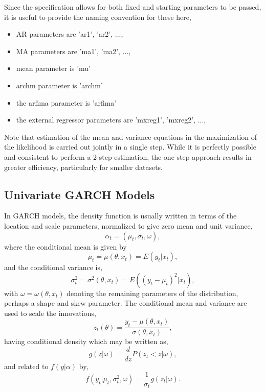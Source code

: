 Since the specification allows for both fixed and starting parameters to be
passed, it is useful to provide the naming convention for these here,
\begin{itemize}
\item AR parameters are 'ar1', 'ar2', ...,
\item MA parameters are 'ma1', 'ma2', ...,
\item mean parameter is 'mu'
\item archm parameter is 'archm'
\item the arfima parameter is 'arfima'
\item the external regressor parameters are 'mxreg1', 'mxreg2', ...,
\end{itemize}
Note that estimation of the mean and variance equations in the maximization of
the likelihood is carried out jointly in a single step. While it is perfectly
possible and consistent to perform a 2-step estimation, the one step approach
results in greater efficiency, particularly for smaller datasets.
\subsection{Univariate GARCH Models}\label{section:ugarch}
In GARCH models, the density function is usually written in terms of the
location and scale parameters, normalized to give zero mean and  unit variance,
\begin{equation}\label{garchdensity1}
{\alpha _t} = ({\mu_t},{\sigma_t},{\omega}),
\end{equation}
where the conditional mean is given by
\begin{equation}\label{garchdensity2}
{\mu _t} = \mu (\theta ,{x_t}) = E({y_t}|{x_t}),
\end{equation}
and the conditional variance is,
\begin{equation}\label{garchdensity3}
\sigma _t^2 = {\sigma ^2}(\theta ,{x_t}) = E({({y_t} - {\mu _t})^2}|{x_t}),
\end{equation}
with ${\omega} = \omega (\theta ,{x_t})$ denoting the remaining parameters of
the distribution, perhaps a shape and skew parameter. The conditional mean and
variance are used to scale the innovations,
\begin{equation}\label{garchdensity4}
{z_t}(\theta ) = \frac{{{y_t} - \mu (\theta ,{x_t})}}{{\sigma (\theta ,{x_t})}},
\end{equation}
having conditional density which may be written as,
\begin{equation}\label{garchdensity5}
g(z|{\omega}) = \frac{d}{{dz}}P({z_t} < z|{\omega}),
\end{equation}
and related to $f(y|\alpha)$ by,
\begin{equation}\label{garchdensity6}
f({y_t}|{\mu _t},\sigma _t^2,{\omega}) = \frac{1}{{{\sigma_t}}}g({z_t}|{\omega}).
\end{equation}

